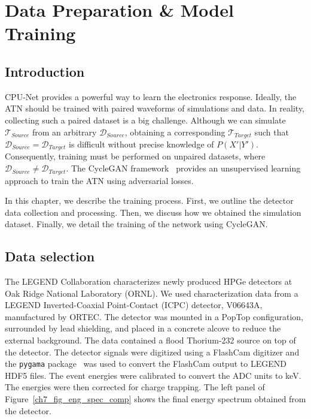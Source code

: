 \chapter{Data Preparation \& Model Training} \label{chap:training}

\section{Introduction}
CPU-Net provides a powerful way to learn the electronics response. Ideally, the ATN should be trained with paired waveforms of simulations and data. In reality, collecting such a paired dataset is a big challenge. Although we can simulate $\mathcal{T}_{Source}$ from an arbitrary $\mathcal{D}_{Source}$, obtaining a corresponding $\mathcal{T}_{Target}$ such that $\mathcal{D}_{Source} = \mathcal{D}_{Target}$ is difficult without precise knowledge of $P(X'|Y')$. Consequently, training must be performed on unpaired datasets, where $\mathcal{D}_{Source} \neq \mathcal{D}_{Target}$. The CycleGAN framework~\cite{CycleGAN} provides an unsupervised learning approach to train the ATN using adversarial losses.

In this chapter, we describe the training process. First, we outline the detector data collection and processing. Then, we discuss how we obtained the simulation dataset. Finally, we detail the training of the network using CycleGAN.

\section{Data selection}

The LEGEND Collaboration characterizes newly produced HPGe detectors at Oak Ridge National Laboratory (ORNL). We used characterization data from a LEGEND Inverted-Coaxial Point-Contact (ICPC) detector, V06643A, manufactured by ORTEC. The detector was mounted in a PopTop configuration, surrounded by lead shielding, and placed in a concrete alcove to reduce the external background. The data contained a flood Thorium-232 source on top of the detector. The detector signals were digitized using a FlashCam digitizer and the \texttt{pygama} package~\cite{pygama} was used to convert the FlashCam output to LEGEND HDF5 files.  The event energies were calibrated to convert the ADC units to keV. The energies were then corrected for charge trapping. The left panel of Figure~\ref{ch7_fig_eng_spec_comp} shows the final energy spectrum obtained from the detector.



